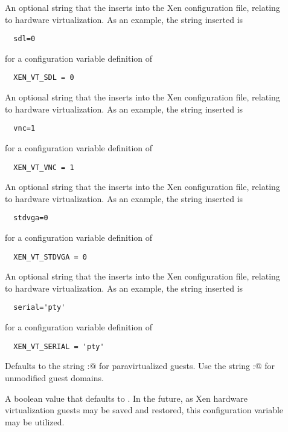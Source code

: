 \begin{description}
\item[]
  \label{param:XenVTSDL}
  An optional string that the 
  inserts into the Xen configuration file, relating to hardware virtualization.
  As an example, the string inserted is
  \begin{verbatim}
  sdl=0
  \end{verbatim}
  for a configuration variable definition of
  \begin{verbatim}
  XEN_VT_SDL = 0
  \end{verbatim}

\item[]
  \label{param:XenVTVNC}
  An optional string that the 
  inserts into the Xen configuration file, relating to hardware virtualization.
  As an example, the string inserted is
  \begin{verbatim}
  vnc=1
  \end{verbatim}
  for a configuration variable definition of
  \begin{verbatim}
  XEN_VT_VNC = 1
  \end{verbatim}

\item[]
  \label{param:XenVTSTDVGA}
  An optional string that the 
  inserts into the Xen configuration file, relating to hardware virtualization.
  As an example, the string inserted is
  \begin{verbatim}
  stdvga=0
  \end{verbatim}
  for a configuration variable definition of
  \begin{verbatim}
  XEN_VT_STDVGA = 0
  \end{verbatim}

\item[]
  \label{param:XenVTSerial}
  An optional string that the 
  inserts into the Xen configuration file, relating to hardware virtualization.
  As an example, the string inserted is
  \begin{verbatim}
  serial='pty'
  \end{verbatim}
  for a configuration variable definition of
  \begin{verbatim}
  XEN_VT_SERIAL = 'pty'
  \end{verbatim}

\item[]
  \label{param:XenDeviceTypeForVT}
  Defaults to the string \verb@vbd:@ for paravirtualized guests.
  Use the string \verb@ioemu:@ for unmodified guest domains. 

\item[]
  \label{param:XenAllowHardwareVTSuspend}
  A boolean value that defaults to .
  In the future, as Xen hardware virtualization guests may be saved
  and restored, this configuration variable may be utilized.

\end{description}

